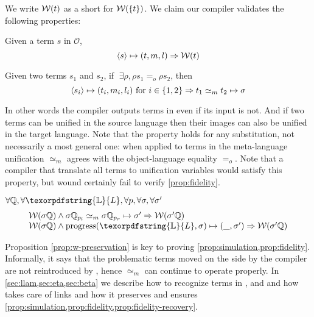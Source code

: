 \documentclass[sigconf,natbib=false,review]{acmart}
\newcommand{\EqualRel}{\ensuremath{=}}
\newcommand{\UnifRel}{\ensuremath{\simeq}}
\newcommand{\Eo}{\ensuremath{\EqualRel_o}\xspace}
\newcommand{\Ue}{\ensuremath{\UnifRel_m}\xspace}
\newcommand{\Fo}{\texorpdfstring{\ensuremath{\mathcal{O}}\xspace}{O}}
\newcommand{\linkStore}{\texorpdfstring{\ensuremath{\mathbb{L}}\xspace}{L}}
\newcommand{\hoUnifPb}{\ensuremath{\mathbb{Q}}\xspace}
\begin{document}
\noindent
We write $\mathcal{W}(t)$ as a short for $\mathcal{W}(\{t\})$.
We claim our compiler validates the following properties: 

\begin{proposition}\label{prop:w-enforcing}
  Given a term $s$ in \Fo{}, 
  $$
    \langle s \rangle\mapsto(t,m,l) \Rightarrow \mathcal{W}(t)
  $$
\end{proposition}

\begin{proposition}\label{prop:w-noncontra}
  Given two terms $s_1$ and $s_2$, if $\;\exists \rho, \rho s_1 \Eo \rho s_2$,
  then 
  $$
    \C{s_i}{t_i}{m_i}{l_i} ~\mathrm{for}~ i \in \{ 1,2 \} \Rightarrow
    t_1 \Ue t_2 \mapsto \sigma \label{prop:compilation-w}
  $$
\end{proposition}

\noindent
In other words the compiler outputs terms in \wellb even if its
input is not. And if two terms can be unified in the source language
then their images can also be unified in the target language. 
Note that the property holds for any substitution, not necessarily a most
general one: when applied to terms in \wellb
the meta-language unification 
\Ue{} agrees with the object-language equality \Eo. Note that a compiler that
translate all terms to unification variables would satisfy this
property, but wound certainly fail to verify \cref{prop:fidelity}.

\begin{proposition}\label{prop:w-preservation}
$\forall \hoUnifPb, \forall \linkStore, \forall p, \forall \sigma, \forall \sigma'$
$$
\begin{array}{l}
\wellb(\sigma\hoUnifPb) \land
  \sigma\hoUnifPb_{p_l} \Ue \sigma\hoUnifPb_{p_r} \mapsto {\sigma'}
  \Rightarrow \wellb(\sigma' \hoUnifPb)\\
\wellb(\sigma\hoUnifPb) \land
  \progress(\linkStore,\sigma) \mapsto (\_,\sigma')
  \Rightarrow \wellb(\sigma' \hoUnifPb)
\end{array}
$$
\end{proposition}

\noindent
Proposition \ref{prop:w-preservation} is key to proving \cref{prop:simulation,prop:fidelity}.
Informally, it says that the problematic terms moved on the side by the compiler
are not reintroduced by \hstep, hence \Ue{} can continue to operate properly.
In \cref{sec:llam,sec:eta,sec:beta}
we describe how to %
recognize terms in \maybebeta, \maybeeta and
\notllambda and how \progress takes care of links and how it preserves \wellb
and ensures \cref{prop:simulation,prop:fidelity,prop:fidelity-recovery}.
\end{document}
